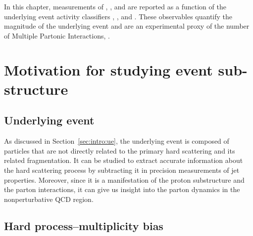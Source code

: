 \label{chap:rt}
\def \imgpath {"./figures/rt"}

In this chapter, measurements of \KOs, \LA, and \AL are reported as a function of the underlying event activity classifiers \RT, \RTmin, and \RTmax. These observables quantify the magnitude of the underlying event and are an experimental proxy of the number of Multiple Partonic Interactions, \nmpi.

\section{Motivation for studying event sub-structure}

\subsection{Underlying event}

As discussed in Section~\ref{sec:intro:ue}, the underlying event is composed of particles that are not directly related to the primary hard scattering and its related fragmentation. It can be studied to extract accurate information about the hard scattering process by subtracting it in precision measurements of jet properties. Moreover, since it is a manifestation of the proton substructure and the parton interactions, it can give us insight into the parton dynamics in the nonperturbative QCD region.


\subsection{Hard process--multiplicity bias}

